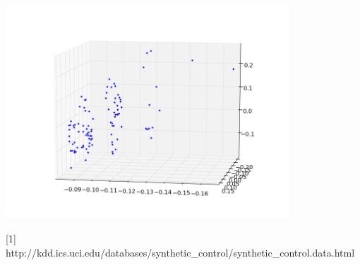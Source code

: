 \documentclass[12pt,fleqn]{article}\usepackage{../common}
\begin{document}
\includegraphics[height=8cm]{wordsvd3.png}




[1] http://kdd.ics.uci.edu/databases/synthetic\_control/synthetic\_control.data.html
\end{document}
